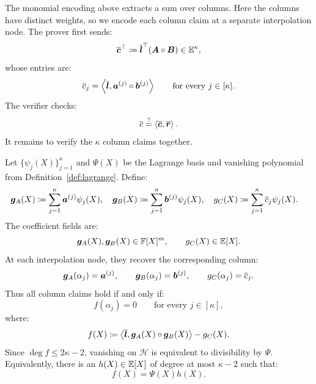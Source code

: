 The monomial encoding above extracts a sum over columns.
Here the columns have distinct weights, so we encode each column
claim at a separate interpolation node. The prover first sends:
\[
    \overline{\bm c}^{\top}
    \coloneqq
    \overline{\bm l}^{\top}
    (\bm A\circ\bm B)
    \in\mathbb{E}^\kappa,
\]
whose entries are:
\[
    \overline{c}_j
    =
    \left\langle
        \overline{\bm l},
        \bm a^{(j)}\circ\bm b^{(j)}
    \right\rangle
    \qquad
    \text{for every }j\in[\kappa].
\]
The verifier checks:
\begin{equation*}
    \overline{c}
    \mathrel{\overset{\mathrm{?}}{=}}
    \left\langle
        \overline{\bm c},\overline{\bm r}
    \right\rangle.
\end{equation*}
It remains to verify the \(\kappa\) column claims together.

Let \(\{\psi_j(X)\}_{j=1}^{\kappa}\) and \(\Psi(X)\) be the
Lagrange basis and vanishing polynomial from
Definition~\ref{def:lagrange}. Define:
\[
\begin{aligned}
    \bm g_A(X)
    &\coloneqq
    \sum_{j=1}^{\kappa}
    \bm a^{(j)}\psi_j(X),
    \quad
    \bm g_B(X)
    \coloneqq
    \sum_{j=1}^{\kappa}
    \bm b^{(j)}\psi_j(X),
    \quad
    g_C(X)
    \coloneqq
    \sum_{j=1}^{\kappa}
    \overline{c}_j\psi_j(X).
\end{aligned}
\]
The coefficient fields are:
\[
    \bm g_A(X),\bm g_B(X)\in{\mathbb{F}}[X]^m,
    \qquad
    g_C(X)\in\mathbb{E}[X].
\]
At each interpolation node, they recover the corresponding column:
\[
    \bm g_A(\alpha_j)=\bm a^{(j)},
    \qquad
    \bm g_B(\alpha_j)=\bm b^{(j)},
    \qquad
    g_C(\alpha_j)=\overline{c}_j.
\]
Thus all column claims hold if and only if:
\[
    f(\alpha_j)=0
    \qquad
    \text{for every }j\in[\kappa],
\]
where:
\begin{equation*}
    f(X)
    \coloneqq
    \left\langle
        \overline{\bm l},
        \bm g_A(X)\circ\bm g_B(X)
    \right\rangle
    -
    g_C(X).
\end{equation*}
Since \(\deg f\leq2\kappa-2\), vanishing on \(\mathcal H\)
is equivalent to divisibility by \(\Psi\). Equivalently, there is
an \(h(X)\in\mathbb{E}[X]\) of degree at most \(\kappa-2\)
such that:
\begin{equation}
    f(X)=\Psi(X)h(X).
\label{eq:hadamard-quotient}
\end{equation}

